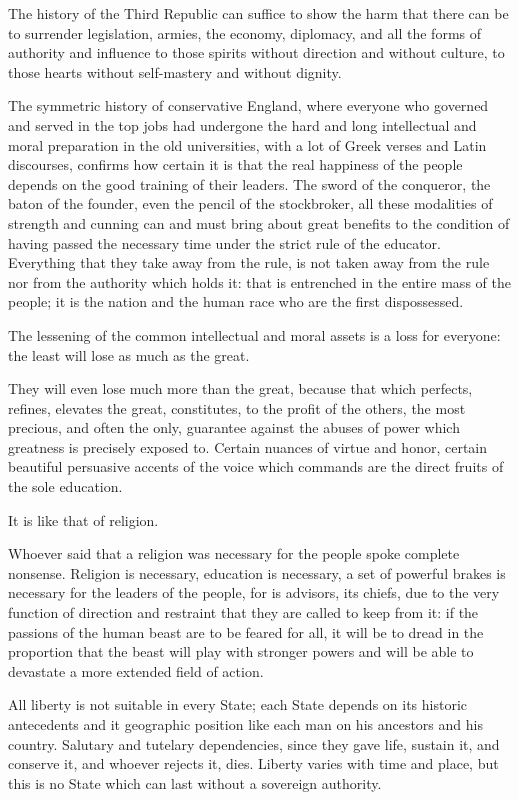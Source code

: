 The history of the Third Republic can suffice to show the harm that there can be to surrender legislation, armies, the economy, diplomacy, and all the forms of authority and influence to those spirits without direction and without culture, to those hearts without self-mastery and without dignity.

The symmetric history of conservative England, where everyone who governed and served in the top jobs had undergone the hard and long intellectual and moral preparation in the old universities, with a lot of Greek verses and Latin discourses, confirms how certain it is that the real happiness of the people depends on the good training of their leaders. The sword of the conqueror, the baton of the founder, even the pencil of the stockbroker, all these modalities of strength and cunning can and must bring about great benefits to the condition of having passed the necessary time under the strict rule of the educator. Everything that they take away from the rule, is not taken away from the rule nor from the authority which holds it: that is entrenched in the entire mass of the people; it is the nation and the human race who are the first dispossessed.

The lessening of the common intellectual and moral assets is a loss for everyone: the least will lose as much as the great.

They will even lose much more than the great, because that which perfects, refines, elevates the great, constitutes, to the profit of the others, the most precious, and often the only, guarantee against the abuses of power which greatness is precisely exposed to. Certain nuances of virtue and honor, certain beautiful persuasive accents of the voice which commands are the direct fruits of the sole education.

It is like that of religion.

Whoever said that a religion was necessary for the people spoke complete nonsense. Religion is necessary, education is necessary, a set of powerful brakes is necessary for the leaders of the people, for is advisors, its chiefs, due to the very function of direction and restraint that they are called to keep from it: if the passions of the human beast are to be feared for all, it will be to dread in the proportion that the beast will play with stronger powers and will be able to devastate a more extended field of action.

All liberty is not suitable in every State; each State depends on its historic antecedents and it geographic position like each man on his ancestors and his country. Salutary and tutelary dependencies, since they gave life, sustain it, and conserve it, and whoever rejects it, dies. Liberty varies with time and place, but this is no State which can last without a sovereign authority.

